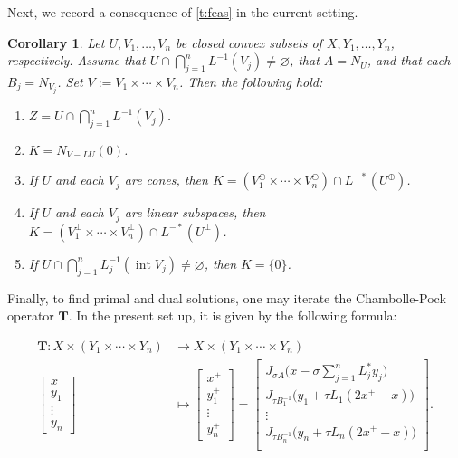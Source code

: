 \documentclass{article}
\newcommand{\inte}{\ensuremath{\operatorname{int}}}
\newcommand{\bT}{\ensuremath{{\mathbf{T}}}}
\newtheorem{corollary}[theorem]{Corollary}
\begin{document}
Next, we record a consequence of \cref{t:feas} in the current setting.

\begin{corollary}
\label{c:feasprod}
Let $U,V_1,\ldots,V_n$ be closed convex subsets of 
$X,Y_1,\ldots,Y_n$, respectively. 
Assume that $U \cap \bigcap_{j=1}^n L^{-1}(V_j)\neq\varnothing$, 
that $A=N_U$, and that each $B_j=N_{V_j}$. 
Set $V := V_1\times \cdots\times V_n$. 
Then the following hold: 
\begin{enumerate}
\item 
\label{c:feasprod1}
$Z = U \cap \bigcap_{j=1}^n L^{-1}(V_j)$. 
\item 
\label{c:feasprod2}
$K = N_{V-LU}(0)$. 
\item 
\label{c:feasprod3}
If $U$ and each $V_j$ are cones, then 
$K=(V_1^\ominus\times\cdots\times V_n^\ominus)
\cap L^{-*}(U^\oplus)$. 
\item 
\label{c:feasprod4}
If $U$ and each $V_j$ are linear subspaces, then 
$K=(V_1^\perp\times\cdots\times V_n^\perp)
\cap L^{-*}(U^\perp)$. 
\item 
\label{c:feasprod5}
If 
$U \cap \bigcap_{j=1}^n L_j^{-1}(\inte V_j)\neq\varnothing$, 
 then $K=\{0\}$. 
\end{enumerate}
\end{corollary}



Finally, to find primal and dual solutions, one may iterate the 
Chambolle-Pock operator $\bT$. 
In the present set up, it is given by the following formula: 

\begin{subequations}
\begin{align} \label{e:Tprod}
\bT \colon X\times (Y_1\times\cdots \times Y_n) 
&\to X\times (Y_1\times\cdots \times Y_n)\\
\begin{bmatrix}x\\y_1\\\vdots\\y_n\end{bmatrix} 
&\mapsto 
  \begin{bmatrix}
  x^+\\y_1^+\\\vdots\\y_n^+
  \end{bmatrix}
  =\begin{bmatrix}
  J_{\sigma A}\big(x-\sigma \sum_{j=1}^n L_j^*y_j\big)\\
  J_{\tau B_1^{-1}}\big(y_1+\tau L_1(2x^+-x)\big)\\
  \vdots\\
  J_{\tau B_n^{-1}}\big(y_n+\tau L_n(2x^+-x)\big)\\
  \end{bmatrix}. 
\end{align}
\end{subequations}
\end{document}
